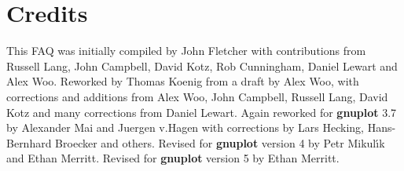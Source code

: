 \documentclass[a4paper,11pt]{article}
\newcommand{\gnuplot}{\textbf{gnuplot }}
\begin{document}
\section{Credits}

This FAQ was initially compiled by John Fletcher with contributions
from Russell Lang, John Campbell, David Kotz, Rob Cunningham, Daniel
Lewart and Alex Woo. Reworked by Thomas Koenig from a draft
by Alex Woo, with corrections and additions from Alex Woo, John
Campbell, Russell Lang, David Kotz and many corrections from Daniel Lewart.
Again reworked for \gnuplot 3.7 by Alexander Mai and Juergen v.Hagen
with corrections by Lars Hecking, Hans-Bernhard Broecker and others.
Revised for \gnuplot version 4 by Petr Mikul\'{\i}k and Ethan Merritt.
Revised for \gnuplot version 5 by Ethan Merritt.
\end{document}
